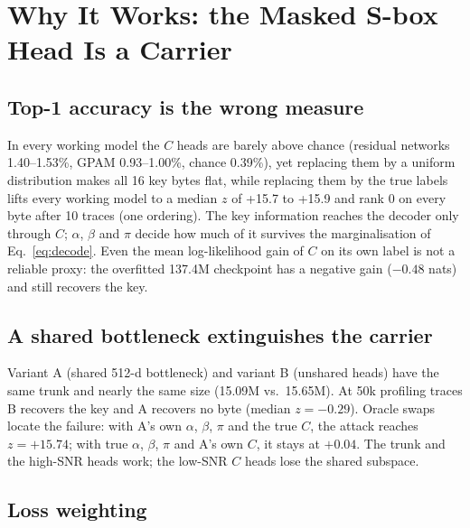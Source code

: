 \section{Why It Works: the Masked S-box Head Is a Carrier}
\label{sec:carrier}

\subsection{Top-1 accuracy is the wrong measure}
In every working model the $C$ heads are barely above chance (residual networks 1.40--1.53\%, GPAM
0.93--1.00\%, chance 0.39\%), yet replacing them by a uniform distribution makes all 16 key bytes flat,
while replacing them by the true labels lifts every working model to a median $z$ of +15.7 to +15.9 and
rank 0 on every byte after 10 traces (one ordering). The key information reaches the decoder
only through $C$; $\alpha$, $\beta$ and $\pi$ decide how much of it survives the marginalisation of
Eq.~\eqref{eq:decode}. Even the mean log-likelihood gain of $C$ on its own label is not a reliable
proxy: the overfitted 137.4M checkpoint has a negative gain ($-0.48$ nats) and still recovers the
key. 

\subsection{A shared bottleneck extinguishes the carrier}
Variant A (shared 512-d bottleneck) and variant B (unshared heads) have the same trunk and nearly the
same size (15.09M vs.\ 15.65M). At
50k profiling traces B recovers the key and A recovers no byte (median $z=-0.29$). Oracle swaps
locate the failure: with A's own $\alpha$, $\beta$, $\pi$ and the true $C$, the attack reaches
$z=+15.74$; with true $\alpha$, $\beta$, $\pi$ and A's own $C$, it stays at $+0.04$. The trunk and
the high-SNR heads work; the low-SNR $C$ heads lose the shared subspace.

\subsection{Loss weighting}
